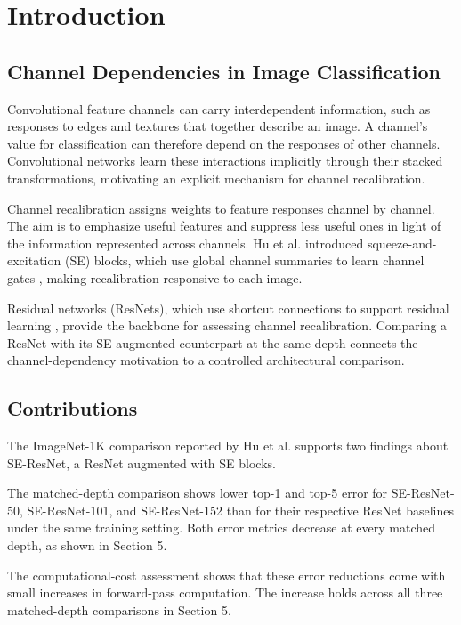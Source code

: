 \section{Introduction}

\subsection{Channel Dependencies in Image Classification}

Convolutional feature channels can carry interdependent information, such as responses to edges and textures that together describe an image. A channel's value for classification can therefore depend on the responses of other channels. Convolutional networks learn these interactions implicitly through their stacked transformations, motivating an explicit mechanism for channel recalibration.

Channel recalibration assigns weights to feature responses channel by channel. The aim is to emphasize useful features and suppress less useful ones in light of the information represented across channels. Hu et al. introduced squeeze-and-excitation (SE) blocks, which use global channel summaries to learn channel gates \cite{hu2018squeeze}, making recalibration responsive to each image.

Residual networks (ResNets), which use shortcut connections to support residual learning \cite{he2016resnet}, provide the backbone for assessing channel recalibration. Comparing a ResNet with its SE-augmented counterpart at the same depth connects the channel-dependency motivation to a controlled architectural comparison.

\subsection{Contributions}

The ImageNet-1K comparison reported by Hu et al. \cite{hu2018squeeze} supports two findings about SE-ResNet, a ResNet augmented with SE blocks.

The matched-depth comparison shows lower top-1 and top-5 error for SE-ResNet-50, SE-ResNet-101, and SE-ResNet-152 than for their respective ResNet baselines under the same training setting. Both error metrics decrease at every matched depth, as shown in Section 5.

The computational-cost assessment shows that these error reductions come with small increases in forward-pass computation. The increase holds across all three matched-depth comparisons in Section 5.
